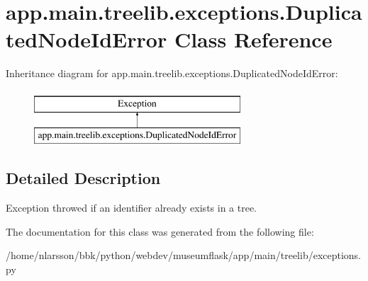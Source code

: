 \hypertarget{classapp_1_1main_1_1treelib_1_1exceptions_1_1DuplicatedNodeIdError}{}\section{app.\+main.\+treelib.\+exceptions.\+Duplicated\+Node\+Id\+Error Class Reference}
\label{classapp_1_1main_1_1treelib_1_1exceptions_1_1DuplicatedNodeIdError}
Inheritance diagram for app.\+main.\+treelib.\+exceptions.\+Duplicated\+Node\+Id\+Error\+:\begin{figure}[H]
\begin{center}
\leavevmode
\includegraphics[height=2.000000cm]{classapp_1_1main_1_1treelib_1_1exceptions_1_1DuplicatedNodeIdError}
\end{center}
\end{figure}


\subsection{Detailed Description}
\begin{DoxyVerb}Exception throwed if an identifier already exists in a tree.\end{DoxyVerb}
 

The documentation for this class was generated from the following file\+:\begin{DoxyCompactItemize}
\item 
/home/nlarsson/bbk/python/webdev/museumflask/app/main/treelib/exceptions.\+py\end{DoxyCompactItemize}
